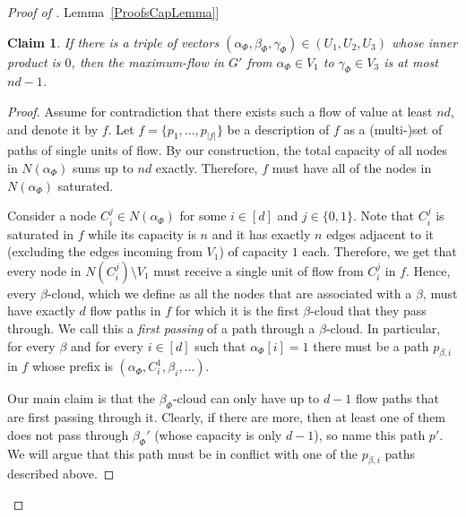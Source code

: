 \documentclass[11pt]{article}
\numberwithin{equation}{section}
\newtheorem{claim}[theorem]{Claim}
\theoremstyle{definition}
\theoremstyle{plain}
\newcommand{\expref}[2]{\hyperref[#2]{#1~\ref{#2}}}
\theoremstyle{plain}
\providecommand{\card}[1]{\lvert#1\rvert}
\begin{document}
\begin{proof}[Proof of \expref{Lemma}{ProofsCapLemma}]
\begin{claim}
If there is a triple of vectors $(\alpha_{\Phi}, \beta_{\Phi}, \gamma_{\Phi})\in (U_1, U_2, U_3)$ whose inner product is $0$, then the maximum-flow in $G'$ from $\alpha_{\Phi} \in V_1$ to $\gamma_{\Phi} \in V_3$ is at most $nd-1$.
\end{claim}

\begin{proof}
Assume for contradiction that there exists such a flow of value at least $nd$, and denote it by $f$.
Let $f=\{p_1,...,p_{\card{f}}\}$ be a description of $f$ as a (multi-)set of paths of single units of flow.
By our construction, the total capacity of all nodes in $N(\alpha_{\Phi})$ sums up to $nd$ exactly.
Therefore, $f$ must have all of the nodes in $N(\alpha_{\Phi})$ saturated.

Consider a node $C_i^j\in N(\alpha_{\Phi})$ for some $i\in [d]$ and $j\in \{0,1\}$.
Note that $C_i^j$ is saturated in $f$ while its capacity is $n$ and it has exactly $n$ edges adjacent to it (excluding the edges incoming from $V_1$) of capacity $1$ each.
Therefore, we get that every node in $N(C_i^j)\setminus V_1$ must receive a single unit of flow from $C_i^j$ in $f$.
Hence, every $\beta$-cloud, which we define as all the nodes that are associated with a $\beta$, must have exactly $d$ flow paths in $f$ for which it is the first $\beta$-cloud that they pass through. We call this a \textit{first passing} of a path through a $\beta$-cloud.
In particular, for every $\beta$ and for every $i\in [d]$ such that $\alpha_{\Phi}[i]=1$ there must be a path $p_{\beta,i}$ in $f$ whose prefix is $(\alpha_{\Phi}, C_i^1, \beta_i,...)$.

Our main claim is that the $\beta_{\Phi}$-cloud can only have up to $d-1$ flow paths that are first passing through it.
Clearly, if there are more, then at least one of them does not pass through ${\beta_{\Phi}}'$ (whose capacity is only $d-1$), so name this path $p'$.
We will argue that this path must be in conflict with one of the $p_{\beta,i}$ paths described above.


\end{proof}
\end{proof}
\end{document}
